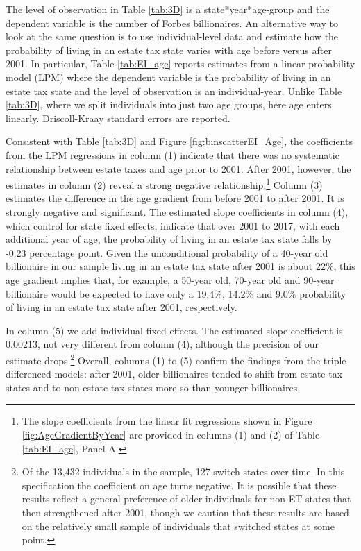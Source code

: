\documentclass[12pt]{article}
\begin{document}
The level of observation in Table \ref{tab:3D} is a state*year*age-group and the dependent variable is the number of Forbes billionaires. An alternative way to look at the same question is to use individual-level data and estimate how the probability of living in an estate tax state varies with age before versus after 2001. In particular, Table \ref{tab:EI_age} reports estimates from a linear probability model (LPM) where the dependent variable is the probability of living in an estate tax state and the level of observation is an individual-year. Unlike Table \ref{tab:3D}, where we split individuals into just two age groups, here age enters linearly. Driscoll-Kraay standard errors are reported. 

Consistent with Table \ref{tab:3D} and Figure \ref{fig:binscatterEI_Age}, the coefficients from the LPM regressions in column (1) indicate that there was no systematic relationship between estate taxes and age prior to 2001. After 2001, however, the estimates in column (2) reveal a strong negative relationship.\footnote{The slope coefficients from the linear fit regressions shown in Figure \ref{fig:AgeGradientByYear}
are provided in columns (1) and (2) of Table \ref{tab:EI_age}, Panel A.}
Column (3) estimates the difference in the age gradient from before 2001 to after 2001. It is strongly negative and significant. The estimated slope coefficients in column (4), which control for state fixed effects, indicate that over 2001 to 2017, with each additional year of age, the probability of living in an estate tax state falls by -0.23 percentage point.  Given the unconditional probability of a 40-year old billionaire in our sample living in an estate tax state after 2001 is about 22\%, this age gradient implies that, for example, a 50-year old, 70-year old and 90-year billionaire would be expected to have only a 19.4\%, 14.2\% and 9.0\% probability of living in an estate tax state after 2001, respectively. 

In column (5) we add individual fixed effects. 
The estimated slope coefficient is 0.00213, not very different from column (4), although the precision of our estimate drops.\footnote{Of the 13,432 individuals in the sample, 127 switch states over time.
In this specification the coefficient on age turns negative. It is possible that these results reflect a general preference of older individuals for non-ET states that then strengthened after 2001, though we caution that these results are based on the relatively small sample of individuals that switched states at some point.}
Overall,  columns (1) to (5) confirm the findings from the triple-differenced models: after 2001, older billionaires tended to shift from estate tax states and to non-estate tax states more so than younger billionaires.
\end{document}
